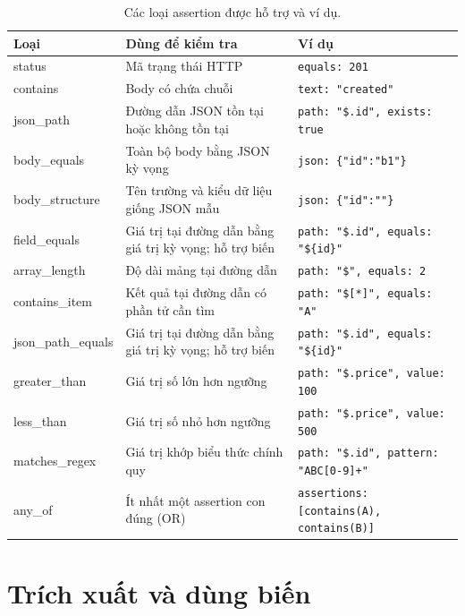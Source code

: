 \documentclass[../BTL.tex]{subfiles}
\begin{document}
\begin{table}[H]
\centering
\small
\begin{tabularx}{\textwidth}{|p{3.5cm}|X|>{\raggedright\arraybackslash}p{4.3cm}|}
\hline
Loại & Dùng để kiểm tra & Ví dụ \\ \hline
\textnormal{status} & Mã trạng thái HTTP & \texttt{equals: 201} \\ \hline
\textnormal{contains} & Body có chứa chuỗi & \texttt{text: "created"} \\ \hline
\textnormal{json\_path} & Đường dẫn JSON tồn tại hoặc không tồn tại & \texttt{path: "\$.id", exists: true} \\ \hline
\textnormal{body\_equals} & Toàn bộ body bằng JSON kỳ vọng & \texttt{json: \{"id":"b1"\}} \\ \hline
\textnormal{body\_structure} & Tên trường và kiểu dữ liệu giống JSON mẫu & \texttt{json: \{"id":""\}} \\ \hline
\textnormal{field\_equals} & Giá trị tại đường dẫn bằng giá trị kỳ vọng; hỗ trợ biến & \texttt{path: "\$.id", equals: "\$\{id\}"} \\ \hline
\textnormal{array\_length} & Độ dài mảng tại đường dẫn & \texttt{path: "\$", equals: 2} \\ \hline
\textnormal{contains\_item} & Kết quả tại đường dẫn có phần tử cần tìm & \texttt{path: "\$[*]", equals: "A"} \\ \hline
\textnormal{json\_path\_equals} & Giá trị tại đường dẫn bằng giá trị kỳ vọng; hỗ trợ biến & \texttt{path: "\$.id", equals: "\$\{id\}"} \\ \hline
\textnormal{greater\_than} & Giá trị số lớn hơn ngưỡng & \texttt{path: "\$.price", value: 100} \\ \hline
\textnormal{less\_than} & Giá trị số nhỏ hơn ngưỡng & \texttt{path: "\$.price", value: 500} \\ \hline
\textnormal{matches\_regex} & Giá trị khớp biểu thức chính quy & \texttt{path: "\$.id", pattern: "ABC[0-9]+"} \\ \hline
\textnormal{any\_of} & Ít nhất một assertion con đúng (OR) & \texttt{assertions: [contains(A), contains(B)]} \\ \hline
\end{tabularx}
\caption{Các loại assertion được hỗ trợ và ví dụ.}
\label{tab:assertion-kinds}
\end{table}

\section{Trích xuất và dùng biến}
\end{document}
